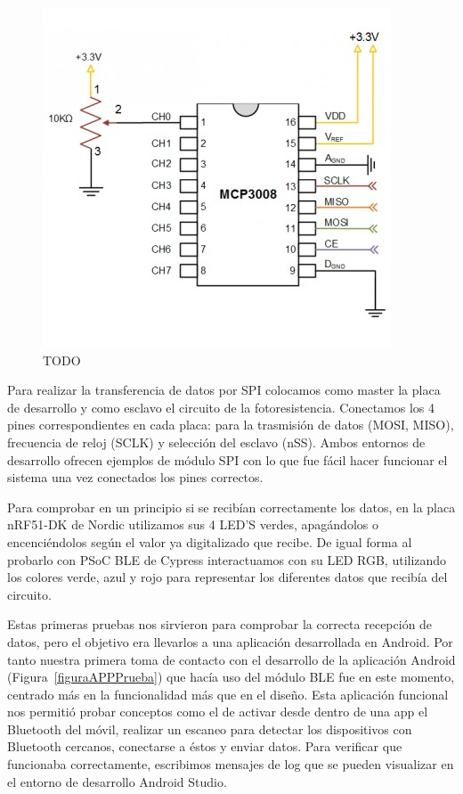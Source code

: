 \begin{figure}[h]%
	\centering
    \includegraphics{figures/mcp3008_esquema.PNG} %
    \caption[TODO]{TODO}
   	\label{figuraMCPEsquema}
\end{figure}

Para realizar la transferencia de datos por SPI colocamos como master la placa de desarrollo y como esclavo el circuito de la fotoresistencia. Conectamos los 4 pines correspondientes en cada placa: para la trasmisión de datos (MOSI, MISO), frecuencia de reloj (SCLK) y selección del esclavo (nSS). Ambos entornos de desarrollo ofrecen ejemplos de módulo SPI con lo que fue fácil hacer funcionar el sistema una vez conectados los pines correctos.

Para comprobar en un principio si se recibían correctamente los datos, en la placa nRF51-DK de Nordic utilizamos sus 4 LED’S verdes, apagándolos o encenciéndolos según el valor ya digitalizado que recibe. De igual forma al probarlo con PSoC BLE de Cypress interactuamos con su LED RGB, utilizando los colores verde, azul y rojo para representar los diferentes datos que recibía del circuito.

Estas primeras pruebas nos sirvieron para comprobar la correcta recepción de datos, pero el objetivo era llevarlos a una aplicación desarrollada en Android. Por tanto nuestra primera toma de contacto con el desarrollo de la aplicación Android (Figura~\ref{figuraAPPPrueba}) que hacía uso del módulo BLE fue en este momento, centrado más en la funcionalidad más que en el diseño. Esta aplicación funcional nos permitió probar conceptos como el de activar desde dentro de una app el Bluetooth del móvil, realizar un escaneo para detectar los dispositivos con Bluetooth cercanos, conectarse a éstos y enviar datos. Para verificar que funcionaba correctamente, escribimos mensajes de log  que se pueden visualizar en el entorno de desarrollo Android Studio.

